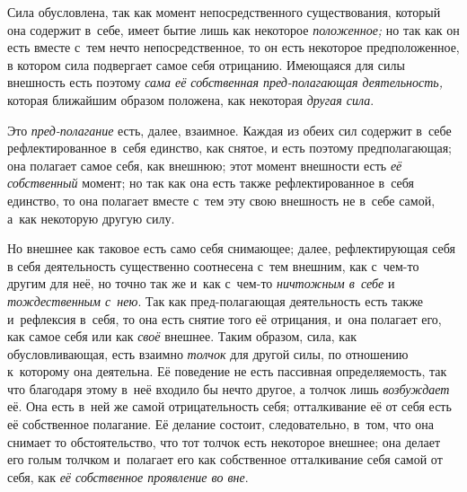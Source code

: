 
Сила обусловлена, так как момент непосредственного существования, который она
содержит в~себе, имеет бытие лишь как некоторое {\em положенное;} но так как он
есть вместе с~тем нечто непосредственное, то он есть некоторое предположенное,
в котором сила подвергает самое себя отрицанию. Имеющаяся для силы внешность
есть поэтому {\em сама её собственная пред-полагающая деятельность,}
которая ближайшим образом положена, как некоторая {\em другая сила}.

Это {\em пред-полагание} есть, далее, взаимное. Каждая
из обеих сил содержит в~себе рефлектированное в~себя единство, как снятое,
и есть поэтому предполагающая; она полагает самое себя, как внешнюю; этот
момент внешности есть {\em её собственный} момент; но
так как она есть также рефлектированное в~себя единство, то она полагает
вместе с~тем эту свою внешность не в~себе самой, а~как некоторую другую силу.

Но внешнее как таковое есть само себя снимающее; далее, рефлектирующая себя
в себя деятельность существенно соотнесена с~тем внешним, как с~чем-то
другим для неё, но точно так же и~как с~чем-то {\em ничтожным в~себе} и
{\em тождественным с~нею}. Так как пред-полагающая
деятельность есть также и~рефлексия в~себя, то она есть снятие того её
отрицания, и~она полагает его, как самое себя или как
{\em своё} внешнее. Таким образом, сила, как
обусловливающая, есть взаимно {\em толчок} для другой
силы, по отношению к~которому она деятельна. Её поведение не есть пассивная
определяемость, так что благодаря этому в~неё входило бы нечто другое, а
толчок лишь {\em возбуждает} её. Она есть в~ней же
самой отрицательность себя; отталкивание её от себя есть её собственное
полагание. Её делание состоит, следовательно, в~том, что она снимает то
обстоятельство, что тот толчок есть некоторое внешнее; она делает его голым
толчком и~полагает его как собственное отталкивание себя самой от себя, как
{\em её собственное проявление во вне}.

